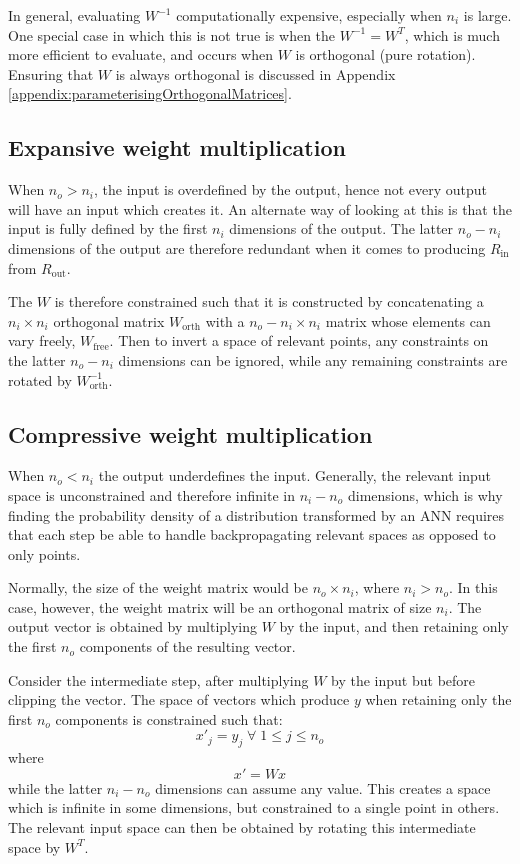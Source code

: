 \documentclass[../../main.tex]{subfiles}
\begin{document}
In general, evaluating $W^{-1}$ computationally expensive, especially when $n_i$ is large.
One special case in which this is not true is when the $W^{-1}=W^T$, which is much more efficient to evaluate, and occurs when $W$ is orthogonal (pure rotation).
Ensuring that $W$ is always orthogonal is discussed in Appendix \ref{appendix:parameterisingOrthogonalMatrices}.

\subsection{Expansive weight multiplication} \label{subsection:expansiveWeightMultiplication}

When $n_o>n_i$, the input is overdefined by the output, hence not every output will have an input which creates it.
An alternate way of looking at this is that the input is fully defined by the first $n_i$ dimensions of the output.
The latter $n_o-n_i$ dimensions of the output are therefore redundant when it comes to producing $R_\text{in}$ from $R_\text{out}$.

The $W$ is therefore constrained such that it is constructed by concatenating a $n_i\times n_i$ orthogonal matrix $W_\text{orth}$ with a $n_o-n_i\times n_i$ matrix whose elements can vary freely, $W_\text{free}$.
Then to invert a space of relevant points, any constraints on the latter $n_o-n_i$ dimensions can be ignored, while any remaining constraints are rotated by $W_\text{orth}^{-1}$.

\subsection{Compressive weight multiplication} \label{subsection:compressiveWeightMultiplication}

When $n_o<n_i$ the output underdefines the input.
Generally, the relevant input space is unconstrained and therefore infinite in $n_i-n_o$ dimensions, which is why finding the probability density of a distribution transformed by an ANN requires that each step be able to handle backpropagating relevant spaces as opposed to only points.

Normally, the size of the weight matrix would be $n_o\times n_i$, where $n_i>n_o$.
In this case, however, the weight matrix will be an orthogonal matrix of size $n_i$.
The output vector is obtained by multiplying $W$ by the input, and then retaining only the first $n_o$ components of the resulting vector.

Consider the intermediate step, after multiplying $W$ by the input but before clipping the vector.
The space of vectors which produce $y$ when retaining only the first $n_o$ components is constrained such that:
\begin{equation}
    x'_j=y_j\;\forall\;1\le j\le n_o
\end{equation}
where
\begin{equation}
    x'=Wx
\end{equation}
while the latter $n_i-n_o$ dimensions can assume any value.
This creates a space which is infinite in some dimensions, but constrained to a single point in others.
The relevant input space can then be obtained by rotating this intermediate space by $W^T$.
\end{document}
